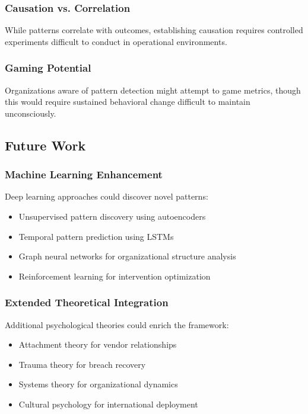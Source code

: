 \documentclass[11pt,a4paper]{article}
\begin{document}
\subsubsection{Causation vs. Correlation}

While patterns correlate with outcomes, establishing causation requires controlled experiments difficult to conduct in operational environments.

\subsubsection{Gaming Potential}

Organizations aware of pattern detection might attempt to game metrics, though this would require sustained behavioral change difficult to maintain unconsciously.

\subsection{Future Work}

\subsubsection{Machine Learning Enhancement}

Deep learning approaches could discover novel patterns:
\begin{itemize}
\item Unsupervised pattern discovery using autoencoders
\item Temporal pattern prediction using LSTMs
\item Graph neural networks for organizational structure analysis
\item Reinforcement learning for intervention optimization
\end{itemize}

\subsubsection{Extended Theoretical Integration}

Additional psychological theories could enrich the framework:
\begin{itemize}
\item Attachment theory for vendor relationships
\item Trauma theory for breach recovery
\item Systems theory for organizational dynamics
\item Cultural psychology for international deployment
\end{itemize}
\end{document}
